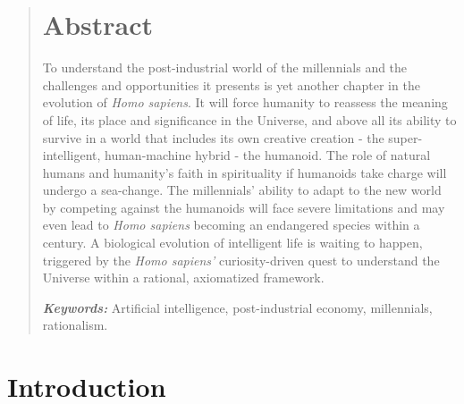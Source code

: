 \begin{multicols}{2}

\begin{quotation}
\section*{Abstract}
\medskip

\noindent
To understand the post-industrial world of the millennials and the challenges and opportunities it presents is yet another chapter in the evolution of \textit{Homo sapiens}. It will force humanity to reassess the meaning of life, its place and significance in the Universe, and above all its ability to survive in a world that includes its own creative creation - the super-intelligent, human-machine hybrid - the humanoid. The role of natural humans and humanity's faith in spirituality if humanoids take charge will undergo a sea-change. The millennials' ability to adapt to the new world by competing against the humanoids will face severe limitations and may even lead to \textit{Homo sapiens} becoming an endangered species within a century. A biological evolution of intelligent life is waiting to happen, triggered by the \textit{Homo sapiens’} curiosity-driven quest to understand the Universe within a rational, axiomatized framework.

\smallskip
\noindent
{\it\bfseries Keywords:} Artificial intelligence, post-industrial economy, millennials, rationalism.
\end{quotation}

\vskip -5pt

\section{Introduction}
\vskip -5pt


\end{multicols}
